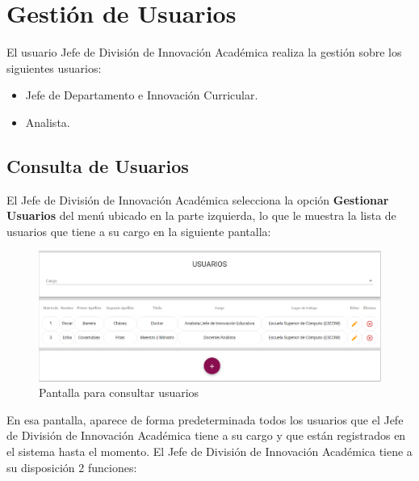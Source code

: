 \clearpage
\section{Gestión de Usuarios}

El usuario  Jefe de División de Innovación Académica  realiza la gestión sobre los siguientes usuarios:
\begin{itemize}
	\item Jefe de Departamento e Innovación Curricular.
	\item Analista.
\end{itemize}
\subsection{Consulta de Usuarios}

El Jefe de División de Innovación Académica  selecciona  la opción \textbf{Gestionar Usuarios} del menú ubicado en la parte izquierda, lo que le muestra la lista de usuarios que tiene a su cargo en la siguiente pantalla:

\begin{figure}[H]
	\centering
	\hypertarget{consultarUs}{\includegraphics[width=0.6\linewidth]{images/SP5/Consultar-Usuario}}
	\caption{Pantalla para consultar usuarios}
	\label{consultarrh}
\end{figure}

En esa pantalla, aparece de forma predeterminada todos los usuarios que el Jefe de División de Innovación Académica  tiene a su cargo y que están registrados en el sistema hasta el momento. El Jefe de División de Innovación Académica  tiene a su disposición 2 funciones:


